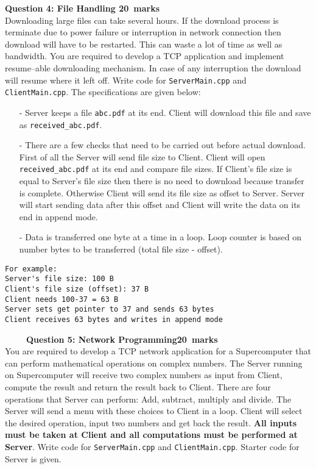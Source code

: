 \documentclass[12pt,a4paper]{article}
\def\Qfour{20}
\def\Qfive{20}
\begin{document}
\newpage
\noindent\textbf{Question 4: File Handling \hfill \Qfour~marks}\\
Downloading large files can take several hours. If the download process is terminate due to power failure or interruption in network connection then download will have to be restarted. This can waste a lot of time as well as bandwidth. You are required to develop a TCP application and implement resume--able downloading mechanism. In case of any interruption the download will resume where it left off.  Write code for \verb|ServerMain.cpp| and \verb|ClientMain.cpp|. The specifications are given below:
\begin{itemize}
\item[-] Server keeps a file \verb|abc.pdf| at its end. Client will download this file and save as \verb|received_abc.pdf|.
\item[-] There are a few checks that need to be carried out before actual download. First of all the Server will send file size to Client. Client will open \verb|received_abc.pdf| at its end and compare file sizes. If Client's file size is equal to Server's file size then there is no need to download because transfer is complete. Otherwise Client will send its file size as offset to Server. Server will start sending data after this offset and Client will write the data on its end in append mode.
\item[-] Data is transferred one byte at a time in a loop. Loop counter is based on number bytes to be transferred (total file size - offset).
\end{itemize}
\begin{verbatim}
For example:
Server's file size: 100 B
Client's file size (offset): 37 B
Client needs 100-37 = 63 B
Server sets get pointer to 37 and sends 63 bytes
Client receives 63 bytes and writes in append mode
\end{verbatim}
\newpage~
\newpage~
\newpage~
\newpage
\noindent\textbf{Question 5: Network Programming\hfill \Qfive~marks}\\
You are required to develop a TCP network application for a Supercomputer that can perform mathematical operations on complex numbers. The Server running on Supercomputer will receive two complex numbers as input from Client, compute the result and return the result back to Client. There are four operations that Server can perform: Add, subtract, multiply and divide. The Server will send a menu with these choices to Client in a loop. Client will select the desired operation, input two numbers and get back the result. \textbf{All inputs must be taken at Client and all computations must be performed at Server}. Write code for \verb|ServerMain.cpp| and \verb|ClientMain.cpp|. Starter code for Server is given.
\end{document}
